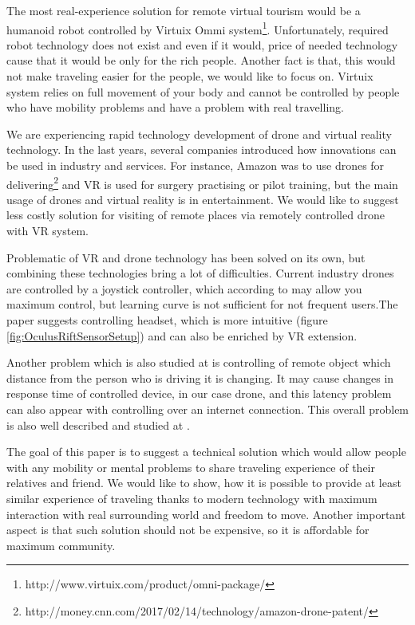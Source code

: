 The most real-experience solution for remote virtual tourism would be a humanoid robot controlled by Virtuix Ommi system\footnote{http://www.virtuix.com/product/omni-package/}. Unfortunately, required robot technology does not exist and even if it would, price of needed technology cause that it would be only for the rich people. Another fact is that, this would not make traveling easier for the people, we would like to focus on. Virtuix system relies on full movement of your body and cannot be controlled by people who have mobility problems and have a problem with real travelling.

We are experiencing rapid technology development of drone and virtual reality technology. In the last years, several companies introduced how innovations can be used in industry and services. For instance, Amazon was to use drones for delivering\footnote{http://money.cnn.com/2017/02/14/technology/amazon-drone-patent/} and VR is used for surgery practising\cite{nagendran2013virtual} or pilot training\cite{grabowski2015virtual}, but the main usage of drones and virtual reality is in entertainment. We would like to suggest less costly solution for visiting of remote places via remotely controlled drone with VR system.

Problematic of VR and drone technology has been solved on its own, but combining these technologies bring a lot of difficulties. Current industry drones are controlled by a joystick controller, which according to \cite{mangina2016drones} may allow you maximum control, but learning curve is not sufficient for not frequent users.The paper suggests controlling headset, which is more intuitive (figure \ref{fig:OculusRiftSensorSetup}) and can also be enriched by VR extension. 

Another problem which is also studied at \cite{mangina2016drones} is controlling of remote object which distance from the person who is driving it is changing. It may cause changes in response time of controlled device, in our case drone, and this latency problem can also appear with controlling over an internet connection. This overall problem is also well described and studied at \cite{benjamin2013drone}.

The goal of this paper is to suggest a technical solution which would allow people with any mobility or mental problems to share traveling experience of their relatives and friend. We would like to show, how it is possible to provide at least similar experience of traveling thanks to modern technology with maximum interaction with real surrounding world and freedom to move. Another important aspect is that such solution should not be expensive, so it is affordable for maximum community.

